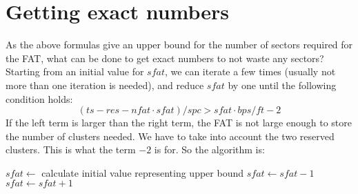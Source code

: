 \documentclass[12pt]{article}
\begin{document}
\section{Getting exact numbers}
As the above formulas give an upper bound for the number of sectors required for the FAT, what can be done to get exact numbers to not waste any sectors? Starting from an initial value for $sfat$, we can iterate a few times (usually not more than one iteration is needed), and reduce $sfat$ by one until the following condition holds:
\begin{equation}
(ts - res - nfat \cdot sfat) / spc > sfat \cdot bps / ft - 2
\end{equation}
If the left term is larger than the right term, the FAT is not large enough to store the number of clusters needed. We have to take into account the two reserved clusters. This is what the term $-2$ is for. So the algorithm is:
\begin{algorithmic}
\State $sfat \gets$ calculate initial value representing upper bound
\State $sfat \gets sfat - 1$
\EndWhile
\State $sfat \gets sfat + 1$
\end{algorithmic}
\end{document}
